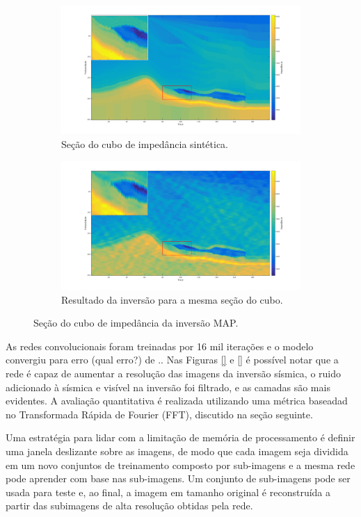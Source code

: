 \begin{figure}[htp]
\centering
\begin{subfigure}{.8\textwidth}
  \centering
  \includegraphics[width=.9\linewidth]{fig/impedance_mount}
  \caption{Seção do cubo de impedância sintética.}
  \label{fig:impedancehr}
\end{subfigure}
\begin{subfigure}{.8\textwidth}
  \centering
  \includegraphics[width=.9\linewidth]{fig/inversion_mount}
  \caption{Resultado da inversão para a mesma seção do cubo.}
  \label{fig:impedancelr}
\end{subfigure}%
\caption{Seção do cubo de impedância da inversão MAP.}
\label{fig:ipedances}
\end{figure}

As redes convolucionais foram treinadas por 16 mil iterações e o modelo convergiu para erro (qual erro?) de ..
Nas Figuras \ref{} e \ref{} é possível notar que a rede é capaz de aumentar a resolução das imagens
da inversão sísmica, o ruido adicionado à sísmica e visível na inversão foi filtrado, e as camadas são mais evidentes.
A avaliação quantitativa é realizada utilizando uma métrica baseadad no Transformada Rápida de Fourier (FFT),
discutido na seção seguinte.


Uma estratégia para lidar com a limitação de memória de processamento é definir uma janela deslizante sobre as imagens, de
modo que cada imagem seja dividida em um novo conjuntos de treinamento composto por sub-imagens e a mesma rede pode
aprender com base nas sub-imagens. Um conjunto de sub-imagens pode ser usada para teste e, ao final, a imagem em tamanho
original é reconstruída a partir das subimagens de alta resolução obtidas pela rede.


